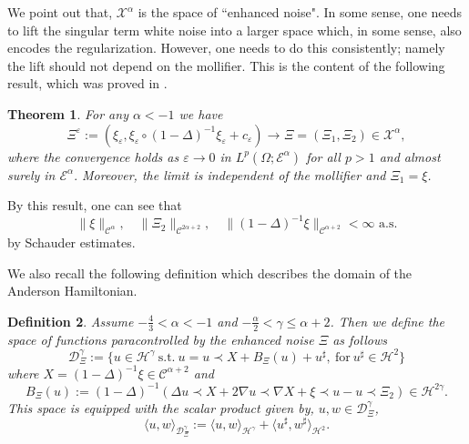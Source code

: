 \documentclass[11pt, oneside]{article}   	%
\newcommand{\assign}{:=}
\newtheorem{theorem}{Theorem}[section]
\newtheorem{definition}[theorem]{Definition}
\newcommand{\CC}{\mathscr{C}}
\newcommand{\ssp}{\mathscr{H}}
\begin{document}
We point out that, $ \mathscr{X}^{\alpha}$ is the space of ``enhanced noise".  In some sense, one needs to lift the singular term white noise into a larger space which, in some sense, also encodes the regularization.  However, one needs to do this consistently; namely the lift should not depend on the mollifier.  This is the content of the following result, which was proved in \cite[Theorem 5.1]{allez_continuous_2015}.

\begin{theorem} 
	\label{thm:2dren}For any $\alpha < - 1$ we have
	\begin{equation} \label{equ:enhancedConv}
	\Xi^{\varepsilon} \assign (\xi_{\varepsilon}, \xi_{\varepsilon} \circ (1
	- \Delta)^{- 1} \xi_{\varepsilon} + c_{\varepsilon}) \rightarrow_{} \Xi=(\Xi_1,\Xi_2)
	\in \mathscr{X}^{\alpha}, 
	\end{equation}
where	the convergence holds as $\varepsilon \rightarrow 0 $  in  $L^p
	(\Omega ; \mathscr{E}^{\alpha})$ for all $p > 1$ and almost surely in $\mathscr{E}^{\alpha}.$ Moreover, the limit is
	independent of the mollifier and $\Xi_1 = \xi$.\end{theorem}





By  this result, one can see that
\[ \| \xi \|_{\CC^{\alpha}}, \quad \|\Xi_2 \|_{\CC^{2 \alpha + 2}},\quad  \| (1 - \Delta)^{- 1} \xi
\|_{\CC^{\alpha + 2}} < \infty \text{ a.s.} \]
by Schauder estimates.





We also recall the following definition which describes the domain of the Anderson Hamiltonian.

\begin{definition}\label{def:2dDXi}
	Assume $- \frac{4}{3} < \alpha < - 1$ and $- \frac{\alpha}{2} < \gamma
	\le \alpha + 2$. Then we define the space of functions
	paracontrolled by the enhanced noise $\Xi$ as follows
	\begin{equation}\label{equ:ansatzmain}
	\mathscr{D}_{\Xi}^{\gamma} \assign \{u \in \ssp^{\gamma} ~\text{s.t.}~ u = u \prec X + B_{\Xi} (u) + u^{\sharp}, ~\text{for}~ u^{\sharp} \in \ssp^2  \}
	\end{equation}
	where $X = (1 - \Delta)^{- 1} \xi \in \CC^{\alpha + 2}$ and
	\[ B_{\Xi} (u) \assign (1 - \Delta)^{- 1} (\Delta u \prec X + 2 \nabla u
	\prec \nabla X + \xi \prec u - u \prec \Xi_2) \in \ssp^{2
		\gamma} . \]
	This space is equipped with the scalar product given by, $u, w \in
	\mathscr{D}_{\Xi}^{\gamma}$,
	\[ \langle u, w
	\rangle_{\mathscr{D}_{\Xi}^{\gamma}} \assign \langle u, w
	\rangle_{\ssp^{\gamma}} + \langle u^{\sharp}, w^{\sharp} \rangle_{\ssp^2}. \]
	

\end{definition}
\end{document}
